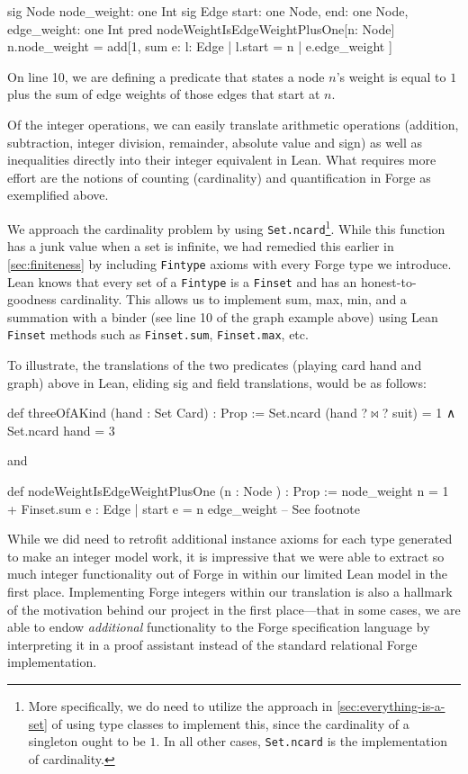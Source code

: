 \begin{forge}
sig Node {
  node_weight: one Int
}
sig Edge {
  start: one Node,
  end: one Node,
  edge_weight: one Int
}
pred nodeWeightIsEdgeWeightPlusOne[n: Node] {
  n.node_weight = add[1, sum e: { l: Edge | l.start = n } | { e.edge_weight }]
}
\end{forge}

On line 10, we are defining a predicate that states a node $n$'s weight is equal to $1$ plus the sum of edge weights of those edges that start at $n$. 

Of the integer operations, we can easily translate arithmetic operations (addition, subtraction, integer division, remainder, absolute value and sign) as well as inequalities directly into their integer equivalent in Lean. What requires more effort are the notions of counting (cardinality) and quantification in Forge as exemplified above. 

We approach the cardinality problem by using \texttt{Set.ncard}\footnote{More specifically, we do need to utilize the approach in \cref{sec:everything-is-a-set} of using type classes to implement this, since the cardinality of a singleton ought to be $1$. In all other cases, \texttt{Set.ncard} is the implementation of cardinality.}. While this function has a junk value when a set is infinite, we had remedied this earlier in \cref{sec:finiteness} by including \texttt{Fintype} axioms with every Forge type we introduce. Lean knows that every set of a \texttt{Fintype} is a \texttt{Finset} and has an honest-to-goodness cardinality. This allows us to implement sum, max, min, and a summation with a binder (see line 10 of the graph example above) using Lean \texttt{Finset} methods such as \texttt{Finset.sum}, \texttt{Finset.max}, etc. 

To illustrate, the translations of the two predicates (playing card hand and graph) above in Lean, eliding sig and field translations, would be as follows:
\begin{lean*}
def threeOfAKind (hand : Set Card) : Prop :=
  Set.ncard (hand ?$\bowtie$? suit) = 1 ∧ Set.ncard hand = 3
\end{lean*}
and 

\begin{lean*}
def nodeWeightIsEdgeWeightPlusOne (n : Node ) : Prop :=
  node_weight n = 1 + Finset.sum { e : Edge | start e = n } edge_weight -- See footnote \footnotemark
\end{lean*}

While we did need to retrofit additional instance axioms for each type generated to make an integer model work, it is impressive that we were able to extract so much integer functionality out of Forge in within our limited Lean model in the first place. Implementing Forge integers within our translation is also a hallmark of the motivation behind our project in the first place---that in some cases, we are able to endow \emph{additional} functionality to the Forge specification language by interpreting it in a proof assistant instead of the standard relational Forge implementation. 
